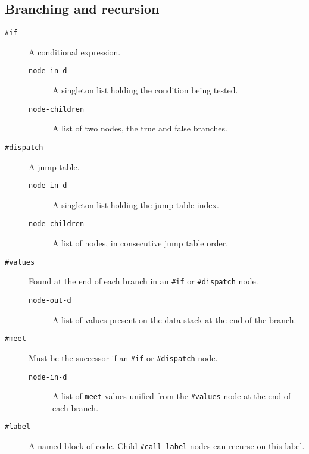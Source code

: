 \documentclass{book}
\begin{document}
\subsection{Branching and recursion}

\begin{description}

\item[\texttt{\#if}] A conditional expression.

\begin{description}
\item[\texttt{node-in-d}]A singleton list holding the condition being tested.\\
\item[\texttt{node-children}]A list of two nodes, the true and false branches.
\end{description}

\item[\texttt{\#dispatch}] A jump table.

\begin{description}
\item[\texttt{node-in-d}]A singleton list holding the jump table index.\\
\item[\texttt{node-children}]A list of nodes, in consecutive jump table order.
\end{description}

\item[\texttt{\#values}] Found at the end of each branch in an \verb|#if| or \verb|#dispatch| node.

\begin{description}
\item[\texttt{node-out-d}]A list of values present on the data stack at the end of the branch.\\
\end{description}

\item[\texttt{\#meet}] Must be the successor if an \verb|#if| or \verb|#dispatch| node.

\begin{description}
\item[\texttt{node-in-d}]A list of \verb|meet| values unified from the \verb|#values| node at the end of each branch.\\
\end{description}

\item[\texttt{\#label}] A named block of code. Child \verb|#call-label| nodes can recurse on this label.


\end{description}
\end{document}

